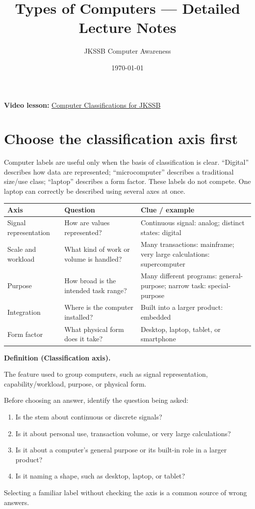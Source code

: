\documentclass[11pt]{article}
\title{Types of Computers --- Detailed Lecture Notes}
\author{JKSSB Computer Awareness}
\date{\today}
\newenvironment{definitionbox}[1]{%
  \par\noindent\textbf{Definition (#1).}\ \itshape
}{\par\vspace{0.3em}}
\begin{document}
\maketitle
\noindent\textbf{Video lesson:}
\href{https://youtu.be/d6zL3YS69kM}{Computer Classifications for JKSSB}

\section{Choose the classification axis first}
Computer labels are useful only when the basis of classification is clear.
``Digital'' describes how data are represented; ``microcomputer'' describes
a traditional size/use class; ``laptop'' describes a form factor. These
labels do not compete. One laptop can correctly be described using several
axes at once.

\begin{center}
\begin{tabular}{p{}p{}p{}}
\toprule
\textbf{Axis} & \textbf{Question} & \textbf{Clue / example}\\
\midrule
Signal representation & How are values represented? & Continuous signal: analog; distinct states: digital\\
Scale and workload & What kind of work or volume is handled? & Many transactions: mainframe; very large calculations: supercomputer\\
Purpose & How broad is the intended task range? & Many different programs: general-purpose; narrow task: special-purpose\\
Integration & Where is the computer installed? & Built into a larger product: embedded\\
Form factor & What physical form does it take? & Desktop, laptop, tablet, or smartphone\\
\bottomrule
\end{tabular}
\end{center}

\begin{definitionbox}{Classification axis}
The feature used to group computers, such as signal representation,
capability/workload, purpose, or physical form.
\end{definitionbox}

Before choosing an answer, identify the question being asked:
\begin{enumerate}
  \item Is the stem about continuous or discrete signals?
  \item Is it about personal use, transaction volume, or very large
    calculations?
  \item Is it about a computer's general purpose or its built-in role in a
    larger product?
  \item Is it naming a shape, such as desktop, laptop, or tablet?
\end{enumerate}
Selecting a familiar label without checking the axis is a common source of
wrong answers.
\end{document}
